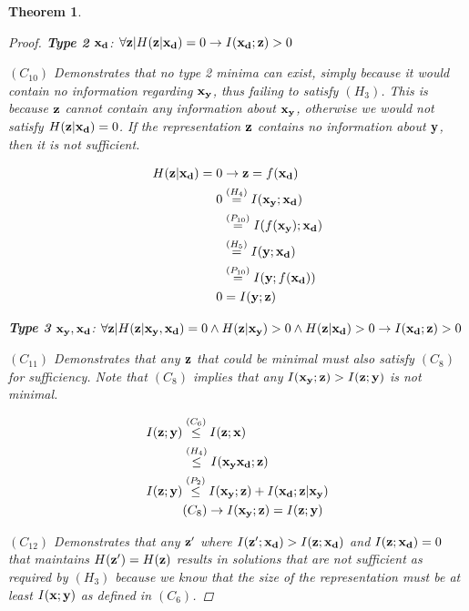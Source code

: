 \documentclass[letterpaper]{article} %
\theoremstyle{plain}
\newtheorem{theorem}{Theorem}[section]
\theoremstyle{definition}
\theoremstyle{remark}
\begin{document}
\begin{theorem}
\begin{proof}
\textbf{Type 2} ${\mathbf{x}}_{\mathbf{d}}$: $\forall {\mathbf{z}}|H({\mathbf{z}}| {\mathbf{x}}_{\mathbf{d}})=0 \rightarrow I({\mathbf{x}}_{\mathbf{d}}; {\mathbf{z}}) > 0$

$(C_{10})$ Demonstrates that no type 2 minima can exist, simply because it would contain no information regarding ${\mathbf{x}}_{\mathbf{y}}$, thus failing to satisfy $(H_3)$. This is because ${\mathbf{z}}$ cannot contain any information about ${\mathbf{x}}_{\mathbf{y}}$, otherwise we would not satisfy $H({\mathbf{z}}|{\mathbf{x}}_{\mathbf{d}})=0$. If the representation ${\mathbf{z}}$ contains no information about ${\mathbf{y}}$, then it is not sufficient. 

$$
\begin{aligned}
    H({\mathbf{z}}| {\mathbf{x}}_{\mathbf{d}}) = 0 & \rightarrow {\mathbf{z}} = f({\mathbf{x}}_{\mathbf{d}}) \\
    0 &\stackrel{\left(H_4\right)}{=} I({\mathbf{x}}_{\mathbf{y}}; {\mathbf{x}}_{\mathbf{d}})\\
    &\stackrel{\left(P_{10}\right)}{=} I(f({\mathbf{x}}_{\mathbf{y}});{\mathbf{x}}_{\mathbf{d}})\\
    &\stackrel{\left(H_5\right)}{=} I({\mathbf{y}}; {\mathbf{x}}_{\mathbf{d}})\\
    &\stackrel{\left(P_{10}\right)}{=} I({\mathbf{y}};f({\mathbf{x}}_{\mathbf{d}}))\\
    0&=I({\mathbf{y}};{\mathbf{z}})
\end{aligned}
$$

\textbf{Type 3} ${\mathbf{x}}_{\mathbf{y}}, {\mathbf{x}}_{\mathbf{d}}$: $\forall {\mathbf{z}}|H({\mathbf{z}}| {\mathbf{x}}_{\mathbf{y}} , {\mathbf{x}}_{\mathbf{d}})=0 \land H({\mathbf{z}}|{\mathbf{x}}_{\mathbf{y}})>0 \land H({\mathbf{z}}| {\mathbf{x}}_{\mathbf{d}})>0 \rightarrow I({\mathbf{x}}_{\mathbf{d}}; {\mathbf{z}}) > 0$

$(C_{11})$ Demonstrates that any ${\mathbf{z}}$ that could be minimal must also satisfy $(C_8)$ for sufficiency. Note that $(C_8)$ implies that any $I({\mathbf{x}}_{\mathbf{y}}; {\mathbf{z}}) >  I({\mathbf{z}};{\mathbf{y}})$ is not minimal.

$$
\begin{aligned}
    I({\mathbf{z}}; {\mathbf{y}})&\stackrel{\left(C_6\right)}{\leq} I({\mathbf{z}}; {\mathbf{x}})  \\
    &\stackrel{\left(H_4\right)}{\leq}  I({\mathbf{x}}_{\mathbf{y}} {\mathbf{x}}_{\mathbf{d}}; {\mathbf{z}}) \\
    I({\mathbf{z}}; {\mathbf{y}}) &\stackrel{\left(P_2\right)}{\leq} I({\mathbf{x}}_{\mathbf{y}}; {\mathbf{z}}) + I({\mathbf{x}}_{\mathbf{d}}; {\mathbf{z}}| {\mathbf{x}}_{\mathbf{y}}) \\
    & (C_8) \rightarrow I({\mathbf{x}}_{\mathbf{y}}; {\mathbf{z}}) =  I({\mathbf{z}}; {\mathbf{y}}) \\
\end{aligned}
$$

$(C_{12})$ Demonstrates that any ${\mathbf{z}}'$ where $I({\mathbf{z}}'; {\mathbf{x}}_{\mathbf{d}})>I({\mathbf{z}}; {\mathbf{x}}_{\mathbf{d}})$ and $I({\mathbf{z}}; {\mathbf{x}}_{\mathbf{d}}) = 0$ that maintains $H({\mathbf{z}}') = H({\mathbf{z}})$ results in  solutions that are not sufficient as required by $(H_3)$ because we know that the size of the representation must be at least $I({\mathbf{x}}; {\mathbf{y}})$ as defined in $(C_6)$.


\end{proof}
\end{theorem}
\end{document}
